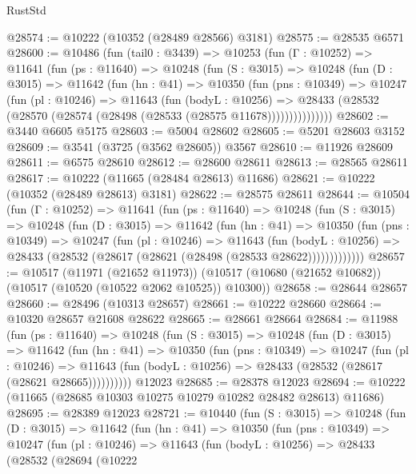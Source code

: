 \begin{lexlean}{RustStd}
\begin{coremodule}
@28574 := @10222 (@10352 (@28489 @28566) @3181)
@28575 := @28535 @6571
@28600 := @10486
    (fun (tail0 : @3439) =>
    @10253
      (fun (Γ : @10252) =>
      @11641
        (fun (ps : @11640) =>
        @10248
          (fun (S : @3015) =>
          @10248
            (fun (D : @3015) =>
            @11642
              (fun (hn : @41) =>
              @10350
                (fun (pns : @10349) =>
                @10247
                  (fun (pl : @10246) =>
                  @11643
                    (fun (bodyL : @10256) =>
                    @28433 (@28532 (@28570 (@28574 (@28498 (@28533 (@28575 @11678)))))))))))))))
@28602 := @3440 @6605 @5175
@28603 := @5004 @28602
@28605 := @5201 @28603 @3152
@28609 := @3541 (@3725 (@3562 @28605)) @3567
@28610 := @11926 @28609
@28611 := @6575 @28610
@28612 := @28600 @28611
@28613 := @28565 @28611
@28617 := @10222 (@11665 (@28484 @28613) @11686)
@28621 := @10222 (@10352 (@28489 @28613) @3181)
@28622 := @28575 @28611
@28644 := @10504
    (fun (Γ : @10252) =>
    @11641
      (fun (ps : @11640) =>
      @10248
        (fun (S : @3015) =>
        @10248
          (fun (D : @3015) =>
          @11642
            (fun (hn : @41) =>
            @10350
              (fun (pns : @10349) =>
              @10247
                (fun (pl : @10246) =>
                @11643
                  (fun (bodyL : @10256) =>
                  @28433 (@28532 (@28617 (@28621 (@28498 (@28533 @28622)))))))))))))
@28657 := @10517
    (@11971 (@21652 @11973))
    (@10517 (@10680 (@21652 @10682)) (@10517 (@10520 (@10522 @2062 @10525)) @10300))
@28658 := @28644 @28657
@28660 := @28496 (@10313 @28657)
@28661 := @10222 @28660
@28664 := @10320 @28657 @21608 @28622
@28665 := @28661 @28664
@28684 := @11988
    (fun (ps : @11640) =>
    @10248
      (fun (S : @3015) =>
      @10248
        (fun (D : @3015) =>
        @11642
          (fun (hn : @41) =>
          @10350
            (fun (pns : @10349) =>
            @10247
              (fun (pl : @10246) =>
              @11643 (fun (bodyL : @10256) => @28433 (@28532 (@28617 (@28621 @28665))))))))))
    @12023
@28685 := @28378 @12023
@28694 := @10222 (@11665 (@28685 @10303 @10275 @10279 @10282 @28482 @28613) @11686)
@28695 := @28389 @12023
@28721 := @10440
    (fun (S : @3015) =>
    @10248
      (fun (D : @3015) =>
      @11642
        (fun (hn : @41) =>
        @10350
          (fun (pns : @10349) =>
          @10247
            (fun (pl : @10246) =>
            @11643
              (fun (bodyL : @10256) =>
              @28433
                (@28532
                  (@28694
                    (@10222

\end{coremodule}
\end{lexlean}
